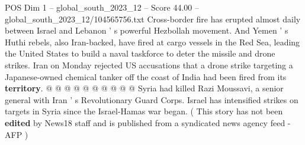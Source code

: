 \begin{textsample}{POS Dim 1 – global\_south\_2023\_12 – Score 44.00 – global\_south\_2023\_12/104565756.txt}
Cross-border fire has erupted almost daily between Israel and Lebanon ' s powerful Hezbollah movement.
And Yemen ' s Huthi rebels, also Iran-backed, have fired at cargo vessels in the Red Sea, leading the United States to build a naval taskforce to deter the missile and drone strikes.
Iran on Monday rejected US accusations that a drone strike targeting a Japanese-owned chemical tanker off the coast of India had been fired from its \textbf{territory}. @ @ @ @ @ @ @ @ @ @ Syria had killed Razi Moussavi, a senior general with Iran ' s Revolutionary Guard Corps.
Israel has intensified strikes on targets in Syria since the Israel-Hamas war began. ( This story has not been \textbf{edited} by News18 staff and is published from a syndicated news agency feed - AFP )

\end{textsample}
